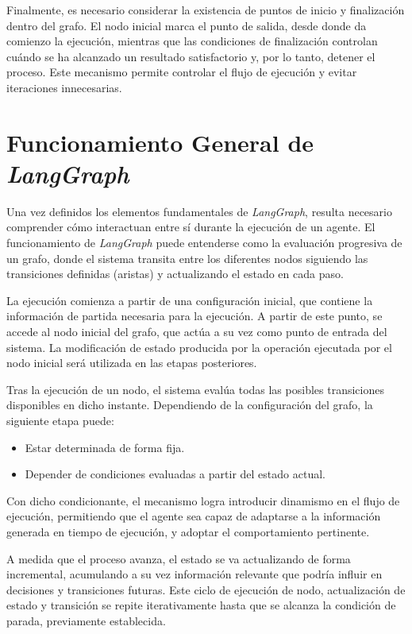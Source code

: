 \documentclass[12pt,a4paper,twoside,openright]{book}
\begin{document}
Finalmente, es necesario considerar la existencia de puntos de inicio y finalización dentro del grafo. El nodo inicial marca el punto de salida, desde donde
da comienzo la ejecución, mientras que las condiciones de finalización controlan cuándo se ha alcanzado un resultado satisfactorio y, por lo tanto,
detener el proceso. Este mecanismo permite controlar el flujo de ejecución y evitar iteraciones innecesarias.


\section{Funcionamiento General de \emph{LangGraph}}

Una vez definidos los elementos fundamentales de \emph{LangGraph}, resulta necesario comprender cómo interactuan entre sí durante la ejecución de un agente. El funcionamiento de
\emph{LangGraph} puede entenderse como la evaluación progresiva de un grafo, donde el sistema transita entre los diferentes nodos siguiendo las transiciones definidas (aristas) y
actualizando el estado en cada paso.

La ejecución comienza a partir de una configuración inicial, que contiene la información de partida necesaria para la ejecución. A partir de este punto,
se accede al nodo inicial del grafo, que actúa a su vez como punto de entrada del sistema. La modificación de estado producida por la operación ejecutada por el nodo inicial será
utilizada en las etapas posteriores.

Tras la ejecución de un nodo, el sistema evalúa todas las posibles transiciones disponibles en dicho instante.
Dependiendo de la configuración del grafo, la siguiente etapa puede:

\begin{itemize}
  \item Estar determinada de forma fija.
  \item Depender de condiciones evaluadas a partir del estado actual.
\end{itemize}

Con dicho condicionante, el mecanismo logra introducir dinamismo en el flujo de ejecución, permitiendo que el agente sea capaz de adaptarse a la información generada en tiempo
de ejecución, y adoptar el comportamiento pertinente.

A medida que el proceso avanza, el estado se va actualizando de forma incremental, acumulando a su vez información relevante que podría influir en decisiones y transiciones futuras.
Este ciclo de ejecución de nodo, actualización de estado y transición se repite iterativamente hasta que se alcanza la condición de parada, previamente establecida. \cite{anderfernandez_langgraph2024}
\end{document}
